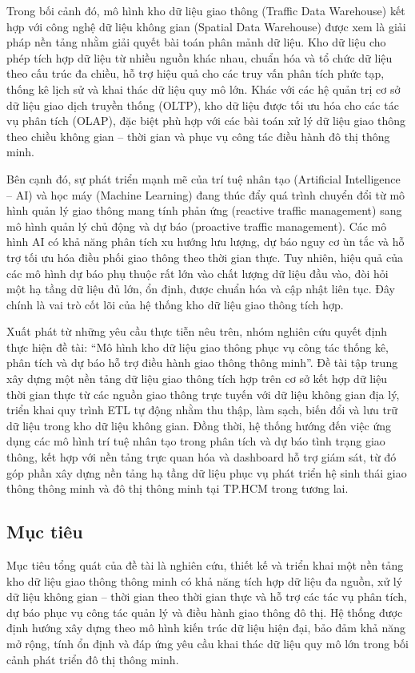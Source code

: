 Trong bối cảnh đó, mô hình kho dữ liệu giao thông (Traffic Data Warehouse) kết hợp với công nghệ dữ liệu không gian (Spatial Data Warehouse) được xem là giải pháp nền tảng nhằm giải quyết bài toán phân mảnh dữ liệu. Kho dữ liệu cho phép tích hợp dữ liệu từ nhiều nguồn khác nhau, chuẩn hóa và tổ chức dữ liệu theo cấu trúc đa chiều, hỗ trợ hiệu quả cho các truy vấn phân tích phức tạp, thống kê lịch sử và khai thác dữ liệu quy mô lớn. Khác với các hệ quản trị cơ sở dữ liệu giao dịch truyền thống (OLTP), kho dữ liệu được tối ưu hóa cho các tác vụ phân tích (OLAP), đặc biệt phù hợp với các bài toán xử lý dữ liệu giao thông theo chiều không gian – thời gian và phục vụ công tác điều hành đô thị thông minh.

Bên cạnh đó, sự phát triển mạnh mẽ của trí tuệ nhân tạo (Artificial Intelligence – AI) và học máy (Machine Learning) đang thúc đẩy quá trình chuyển đổi từ mô hình quản lý giao thông mang tính phản ứng (reactive traffic management) sang mô hình quản lý chủ động và dự báo (proactive traffic management). Các mô hình AI có khả năng phân tích xu hướng lưu lượng, dự báo nguy cơ ùn tắc và hỗ trợ tối ưu hóa điều phối giao thông theo thời gian thực. Tuy nhiên, hiệu quả của các mô hình dự báo phụ thuộc rất lớn vào chất lượng dữ liệu đầu vào, đòi hỏi một hạ tầng dữ liệu đủ lớn, ổn định, được chuẩn hóa và cập nhật liên tục. Đây chính là vai trò cốt lõi của hệ thống kho dữ liệu giao thông tích hợp.

Xuất phát từ những yêu cầu thực tiễn nêu trên, nhóm nghiên cứu quyết định thực hiện đề tài: “Mô hình kho dữ liệu giao thông phục vụ công tác thống kê, phân tích và dự báo hỗ trợ điều hành giao thông thông minh”. Đề tài tập trung xây dựng một nền tảng dữ liệu giao thông tích hợp trên cơ sở kết hợp dữ liệu thời gian thực từ các nguồn giao thông trực tuyến với dữ liệu không gian địa lý, triển khai quy trình ETL tự động nhằm thu thập, làm sạch, biến đổi và lưu trữ dữ liệu trong kho dữ liệu không gian. Đồng thời, hệ thống hướng đến việc ứng dụng các mô hình trí tuệ nhân tạo trong phân tích và dự báo tình trạng giao thông, kết hợp với nền tảng trực quan hóa và dashboard hỗ trợ giám sát, từ đó góp phần xây dựng nền tảng hạ tầng dữ liệu phục vụ phát triển hệ sinh thái giao thông thông minh và đô thị thông minh tại TP.HCM trong tương lai.


\subsection{Mục tiêu}

Mục tiêu tổng quát của đề tài là nghiên cứu, thiết kế và triển khai một nền tảng kho dữ liệu giao thông thông minh có khả năng tích hợp dữ liệu đa nguồn, xử lý dữ liệu không gian – thời gian theo thời gian thực và hỗ trợ các tác vụ phân tích, dự báo phục vụ công tác quản lý và điều hành giao thông đô thị. Hệ thống được định hướng xây dựng theo mô hình kiến trúc dữ liệu hiện đại, bảo đảm khả năng mở rộng, tính ổn định và đáp ứng yêu cầu khai thác dữ liệu quy mô lớn trong bối cảnh phát triển đô thị thông minh.


